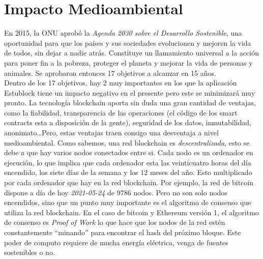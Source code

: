 \chapter{Impacto Medioambiental}
\label{cap:ImpactoMedioAmbiente}

En 2015, la ONU aprobó la \emph{Agenda 2030 sobre el Desarrollo Sostenible}\cite{agenda2030}, una oportunidad para que los países y sus sociedades evolucionen y mejoren la vida de todos, sin dejar a nadie atrás. Constituye un llamamiento universal a la acción para poner fin a la pobreza, proteger el planeta y mejorar la vida de personas y animales. Se aprobaron entonces 17 objetivos\cite{17objetivos} a alcanzar en 15 años. \\

Dentro de los 17 objetivos, hay 2 muy importantes en los que la aplicación Estublock tiene un impacto negativo en el presente pero este se minimizará muy pronto. La tecnología blockchain aporta sin duda una gran cantidad de ventajas, como la fiabilidad, transparencia de las operaciones (el código de los smart contracts esta a disposición de la gente), seguridad de los datos, inmutabilidad, anonimato\dots Pero, estas ventajas traen consigo una desventaja a nivel medioambiental. Como sabemos, una red blockchain es \emph{descentralizada}, esto se debe a que hay varios nodos conectados entre si. Cada nodo es un ordenador en ejecución, lo que implica que cada ordenador esta las veinticuatro horas del día encendido, los siete días de la semana y los 12 meses del año. Esto multiplicado por cada ordenador que hay en la red blockchain. Por ejemplo, la red de bitcoin dispone a día de hoy \textit{2021-05-24} de 9786 nodos\cite{bitcoinNodos}. Pero no son solo nodos encendidos, sino que un punto muy importante es el algoritmo de consenso que utiliza la red blockchain. En el caso de bitcoin y Ethereum versión 1, el algoritmo de consenso es \emph{Proof of Work} lo que hace que los nodos de la red estén constantemente ``minando'' para encontrar el hash del próximo bloque. Este poder de computo requiere de mucha energía eléctrica, venga de fuentes sostenibles o no. \\

